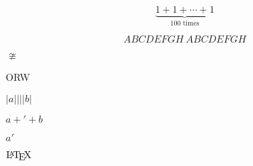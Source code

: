 \documentclass{article}
\begin{document}
\begin{equation*}
 \underbrace{
  1 + 1 + \dotsb + 1
 }_{\text{\(100\) times}}
\end{equation*}

\begin{equation*}
 \mathit{ABCDEFGH}\ ABCDEFGH
\end{equation*}

\(\ncong\)

{\Huge ORW}

\(\lvert a \rvert || \lvert b \rvert\)

\(a + \prime + b\)

\(a\prime\)

\(\text\LaTeX\)
\end{document}

